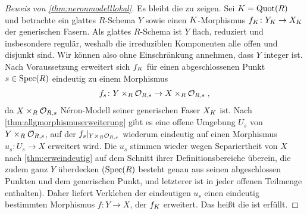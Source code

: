 \begin{proof}[Beweis von \ref{thm:neronmodelllokal}]
  Es bleibt die \NAbbEig zu zeigen.
  Sei $K=\operatorname{Quot}(R)$ und betrachte ein glattes $R$-Schema $Y$ sowie
  einen $K$-Morphismus $f_{K}\colon Y_{K}\to X_{K}$ der
  generischen Fasern.
  Als glattes $R$-Schema ist $Y$ flach, reduziert und insbesondere
  regulär, weshalb die irreduziblen Komponenten alle offen und
  disjunkt sind. Wir können also ohne Einschränkung annehmen, dass
  $Y$ integer ist.
  Nach Voraussetzung erweitert sich $f_{K}$ für einen abgeschlossenen
  Punkt $s\in\operatorname{Spec}(R)$ eindeutig zu einem Morphismus
  \begin{gather*}
    f_s\colon Y\times_R\mathcal{O}_{R,s}\to X\times_R\mathcal{O}_{R,s}\;,
  \end{gather*}
  da $X\times_R\mathcal{O}_{R,s}$ Néron-Modell seiner generischen Faser $X_{K}$
  ist.
  Nach \ref{thm:allgmorphismuserweiterung} gibt es eine offene
  Umgebung $U_s$ von $Y\times_R\mathcal{O}_{R,s}$, auf der
  $f_s|_{Y\times_R\mathcal{O}_{R,s}}$ wiederum
  eindeutig auf einen Morphismus $u_s\colon U_s\to X$ erweitert
  wird.
  Die $u_s$ stimmen wieder wegen Separiertheit von $X$
  nach \ref{thm:erweindeutig} auf dem Schnitt ihrer
  Definitionsbereiche überein, die zudem ganz $Y$ überdecken
  ($\operatorname{Spec}(R)$ besteht genau aus seinen
  abgeschlossen Punkten und dem generischen Punkt, und letzterer ist
  in jeder offenen Teilmenge enthalten).
  Daher liefert Verkleben der eindeutigen $u_s$ einen
  eindeutig bestimmten Morphismus $f\colon Y\to X$, der
  $f_{K}$ erweitert.
  Das heißt die \NAbbEig ist erfüllt.
\end{proof}


